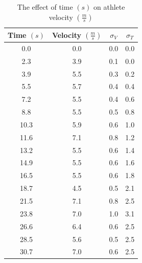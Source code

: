 \documentclass[index]{subfiles}
\begin{document}
\begin{table}[H]
    \centering
    \caption{The effect of time \((s)\) on athlete velocity \((\frac{m}{s})\)}
    \begin{tabular}{@{}cccc@{}} \toprule
        {Time \((s)\)} & {Velocity \((\frac{m}{s})\)} & {\(\sigma_{V}\)} & {\(\sigma_{T}\)} \\ \midrule
        0.0            & 0.0                          & 0.0              & 0.0              \\
        2.3            & 3.9                          & 0.1              & 0.0              \\
        3.9            & 5.5                          & 0.3              & 0.2              \\
        5.5            & 5.7                          & 0.4              & 0.4              \\
        7.2            & 5.5                          & 0.4              & 0.6              \\
        8.8            & 5.5                          & 0.5              & 0.8              \\
        10.3           & 5.9                          & 0.6              & 1.0              \\
        11.6           & 7.1                          & 0.8              & 1.2              \\
        13.2           & 5.5                          & 0.6              & 1.4              \\
        14.9           & 5.5                          & 0.6              & 1.6              \\
        16.5           & 5.5                          & 0.6              & 1.8              \\
        18.7           & 4.5                          & 0.5              & 2.1              \\
        21.5           & 7.1                          & 0.8              & 2.5              \\
        23.8           & 7.0                          & 1.0              & 3.1              \\
        26.6           & 6.4                          & 0.6              & 2.5              \\
        28.5           & 5.6                          & 0.5              & 2.5              \\
        30.7           & 7.0                          & 0.6              & 2.5
    \end{tabular}
\end{table}
\end{document}
